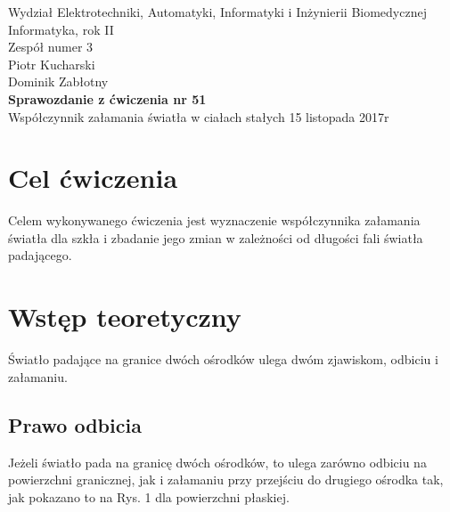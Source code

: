 \documentclass[a4paper,12pts]{article}
\begin{document}
	\thispagestyle{empty}
	\begin{flushleft}
		Wydział Elektrotechniki, Automatyki, Informatyki i Inżynierii Biomedycznej \\
		Informatyka, rok II \\
		Zespół numer 3 \\
		Piotr Kucharski \\
		Dominik Zabłotny \\
		\vspace*{\fill}
		{\large \textbf{Sprawozdanie z ćwiczenia nr 51} } \\
		Współczynnik załamania światła w ciałach stałych		
		\vfill	
		15 listopada 2017r
	\end{flushleft}
	
	\newpage
	
	
		\section{Cel ćwiczenia}
	
	Celem wykonywanego ćwiczenia jest wyznaczenie współczynnika załamania światła dla szkła i zbadanie jego zmian w zależności od długości fali światła padającego.
	
	
	\section{Wstęp teoretyczny}
	
	Światło padające na granice dwóch ośrodków ulega dwóm zjawiskom, odbiciu i załamaniu.
	
	\subsection{Prawo odbicia}
	
	Jeżeli światło pada na granicę dwóch ośrodków, to ulega zarówno odbiciu na powierzchni granicznej, jak i załamaniu przy przejściu do drugiego ośrodka tak, jak pokazano to na Rys. 1 dla powierzchni płaskiej.
	
\end{document}

